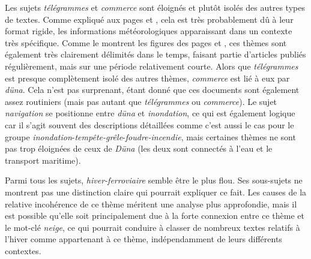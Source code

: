 \documentclass[a4paper,twoside,12pt]{article}
\begin{document}
Les sujets \textit{télégrammes} et \textit{commerce} sont éloignés et plutôt isolés des autres types de textes. Comme expliqué aux pages \pageref{topic10_télégrammes} et \pageref{topic4_commerce}, cela est très probablement dû à leur format rigide, les informations météorologiques apparaissant dans un contexte très spécifique. Comme le montrent les figures des pages \pageref{topic10_télégrammes} et \pageref{topic4_commerce}, ces thèmes sont également très clairement délimités dans le temps, faisant partie d'articles publiés régulièrement, mais sur une période relativement courte. Alors que \textit{télégrammes} est presque complètement isolé des autres thèmes, \textit{commerce} est lié à eux par \textit{düna}. Cela n'est pas surprenant, étant donné que ces documents sont également assez routiniers (mais pas autant que \textit{télégrammes} ou \textit{commerce}). Le sujet \textit{navigation} se positionne entre \textit{düna} et \textit{inondation}, ce qui est également logique car il s'agit souvent des descriptions détaillées comme c'est aussi le cas pour le groupe \textit{inondation}-\textit{tempête-grêle}-\textit{foudre-incendie}, mais certaines thèmes ne sont pas trop éloignées de ceux de \textit{Düna} (les deux sont connectés à l'eau et le transport maritime).

Parmi tous les sujets, \textit{hiver-ferroviaire} semble être le plus flou. Ses sous-sujets ne montrent pas une distinction claire qui pourrait expliquer ce fait. Les causes de la relative incohérence de ce thème méritent une analyse plus approfondie, mais il est possible qu'elle soit principalement due à la forte connexion entre ce thème et le mot-clé \textit{neige}, ce qui pourrait conduire à classer de nombreux textes relatifs à l'hiver comme appartenant à ce thème, indépendamment de leurs différents contextes.
\end{document}
